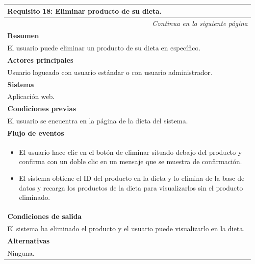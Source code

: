 \begin{longtable}{|p{}|}
\hline
 \rowcolor[gray]{.5}
 \color{white}\textbf{Requisito 18: Eliminar producto de su dieta.} \\
\hline
\endfirsthead
\endhead
\hline \multicolumn{1}{r}{\textit{Continua en la siguiente página}} \\
\endfoot
\endlastfoot
    \rowcolor[gray]{.9}
     \textbf{Resumen} \\
     \hline
     El usuario puede eliminar un producto de su dieta en específico. \\
     \hline
     \rowcolor[gray]{.9}
     \textbf{Actores principales} \\
     \hline
     Usuario logueado con usuario estándar o con usuario administrador. \\
     \hline
     \rowcolor[gray]{.9}
     \textbf{Sistema} \\
     \hline
     Aplicación web. \\
     \hline
     \rowcolor[gray]{.9}
     \textbf{Condiciones previas} \\
     \hline
     El usuario se encuentra en la página de la dieta del sistema. \\
     \hline
     \rowcolor[gray]{.9}
     \textbf{Flujo de eventos}  \\
     \hline
      \begin{itemize}
         \item El usuario hace clic en el botón de eliminar situado debajo del producto y confirma con un doble clic en un mensaje que se muestra de confirmación.
         \item El sistema obtiene el ID del producto en la dieta y lo elimina de la base de datos y recarga los productos de la dieta para visualizarlos sin el producto eliminado.
     \end{itemize} \\
     \hline
     \rowcolor[gray]{.9}
     \textbf{Condiciones de salida} \\
     \hline
     El sistema ha eliminado el producto y el usuario puede visualizarlo en la dieta. \\
     \hline
     \rowcolor[gray]{.9}
     \textbf{Alternativas}  \\
     \hline
      Ninguna.\\
     \hline
\end{longtable}

